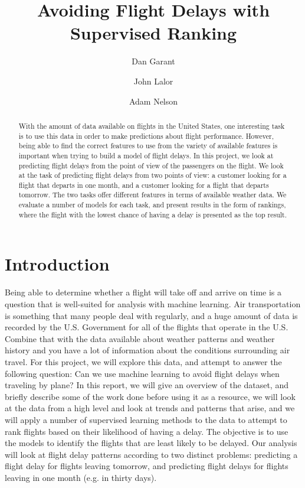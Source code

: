 \documentclass{article}
\title{Avoiding Flight Delays with Supervised Ranking}
\author{Dan Garant \and John Lalor \and Adam Nelson}
\date{}
\begin{document}
\maketitle

\begin{abstract}
With the amount of data available on flights in the United States, one interesting task is to use this data in order to make predictions about flight performance. However, being able to find the correct features to use from the variety of available features is important when trying to build a model of flight delays. In this project, we look at predicting flight delays from the point of view of the passengers on the flight. We look at the task of predicting flight delays from two points of view: a customer looking for a flight that departs in one month, and a customer looking for a flight that departs tomorrow. The two tasks offer different features in terms of available weather data. We evaluate a number of models for each task, and present results in the form of rankings, where the flight with the lowest chance of having a delay is presented as the top result.
\end{abstract}

\section{Introduction}

Being able to determine whether a flight will take off and arrive on time is a question that is well-suited for analysis with machine learning. Air transportation is something that many people deal with regularly, and a huge amount of data is recorded by the U.S. Government for all of the flights that operate in the U.S. Combine that with the data available about weather patterns and weather history and you have a lot of information about the conditions surrounding air travel. For this project, we will explore this data, and attempt to answer the following question: Can we use machine learning to avoid flight delays when traveling by plane? In this report, we will give an overview of the dataset, and briefly describe some of the work done before using it as a resource, we will look at the data from a high level and look at trends and patterns that arise, and we will apply a number of supervised learning methods to the data to attempt to rank flights based on their likelihood of having a delay. The objective is to use the models to identify the flights that are least likely to be delayed. Our analysis will look at flight delay patterns according to two distinct problems: predicting a flight delay for flights leaving tomorrow, and predicting flight delays for flights leaving in one month (e.g. in thirty days).
\end{document}
